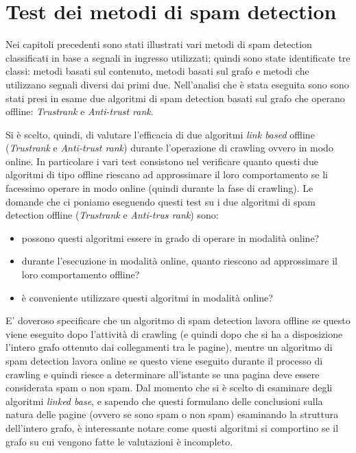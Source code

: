 \chapter{Test dei metodi di spam detection}
Nei capitoli precedenti sono stati illustrati vari metodi di spam detection classificati in base a segnali in ingresso utilizzati; quindi sono state identificate tre classi: metodi basati sul contenuto, metodi basati sul grafo e metodi che utilizzano segnali diversi dai primi due. Nell'analisi che è stata eseguita sono sono stati presi in esame due algoritmi di spam detection basati sul grafo che operano offline: \textit{Trustrank} e \textit{Anti-trust rank}. 

Si è scelto, quindi, di valutare l'efficacia di due  algoritmi \textit{link based} offline (\textit{Trustrank} e \textit{Anti-trust rank}) durante l'operazione di crawling ovvero in modo online. In particolare i vari test consistono nel verificare quanto questi due algoritmi di tipo offline riescano ad approssimare il loro comportamento se li facessimo operare in modo online (quindi durante la fase di crawling). Le domande che ci poniamo eseguendo questi test su i due algoritmi di spam detection offline (\textit{Trustrank} e \textit{Anti-trus rank}) sono:
\begin{itemize}
 \item possono questi algoritmi essere in grado di operare in modalità online?
 \item durante l'esecuzione in modalità online, quanto riescono ad approssimare il loro comportamento offline?
 \item è conveniente utilizzare questi algoritmi in modalità online?
\end{itemize}

E' doveroso specificare che un algoritmo di spam detection lavora offline se questo viene eseguito dopo l'attività di crawling (e quindi dopo che si ha a disposizione l'intero grafo ottenuto dai collegamenti tra le pagine), mentre un algoritmo di spam detection lavora online se questo viene eseguito durante il processo di crawling e quindi riesce a determinare all'istante se una pagina deve essere considerata spam o non spam. Dal momento che si è scelto di esaminare degli algoritmi \textit{linked base}, e sapendo che questi formulano delle conclusioni sulla natura delle pagine (ovvero se sono spam o non spam) esaminando la struttura dell'intero grafo, è interessante notare come questi algoritmi si comportino se il grafo su cui vengono fatte le valutazioni è incompleto.

